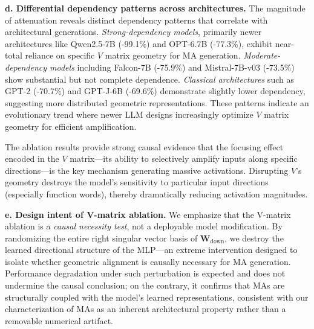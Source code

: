 \documentclass[conference]{IEEEtran}
\begin{document}
\smallskip
\noindent\textbf{d. Differential dependency patterns across architectures.}
The magnitude of attenuation reveals distinct dependency patterns that correlate with architectural generations. \textit{Strong-dependency models}, primarily newer architectures like Qwen2.5-7B (-99.1\%) and OPT-6.7B (-77.3\%), exhibit near-total reliance on specific $V$ matrix geometry for MA generation. \textit{Moderate-dependency models} including Falcon-7B (-75.9\%) and Mistral-7B-v03 (-73.5\%) show substantial but not complete dependence. \textit{Classical architectures} such as GPT-2 (-70.7\%) and GPT-J-6B (-69.6\%) demonstrate slightly lower dependency, suggesting more distributed geometric representations. These patterns indicate an evolutionary trend where newer LLM designs increasingly optimize $V$ matrix geometry for efficient amplification.

The ablation results provide strong causal evidence that the focusing effect encoded in the $V$ matrix---its ability to selectively amplify inputs along specific directions---is the key mechanism generating massive activations. Disrupting $V$'s geometry destroys the model's sensitivity to particular input directions (especially function words), thereby dramatically reducing activation magnitudes.

\smallskip
\noindent\textbf{e. Design intent of V-matrix ablation.}
We emphasize that the V-matrix ablation is a \textit{causal necessity test}, not a deployable model modification. By randomizing the entire right singular vector basis of $\mathbf{W}_{\text{down}}$, we destroy the learned directional structure of the MLP---an extreme intervention designed to isolate whether geometric alignment is causally necessary for MA generation. Performance degradation under such perturbation is expected and does not undermine the causal conclusion; on the contrary, it confirms that MAs are structurally coupled with the model's learned representations, consistent with our characterization of MAs as an inherent architectural property rather than a removable numerical artifact.

\vspace{0.5em}
\noindent{}
\vspace{0.5em}
\end{document}
